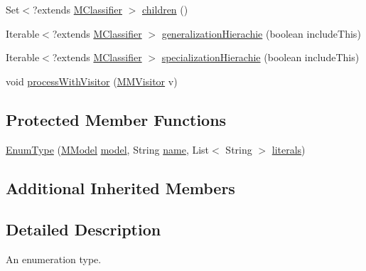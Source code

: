 \begin{DoxyCompactItemize}
\item 
Set$<$?extends \hyperlink{interfaceorg_1_1tzi_1_1use_1_1uml_1_1mm_1_1_m_classifier}{M\-Classifier} $>$ \hyperlink{classorg_1_1tzi_1_1use_1_1uml_1_1ocl_1_1type_1_1_enum_type_acdc9647c394633c3cb21d9c0d3443e03}{children} ()
\item 
Iterable$<$?extends \hyperlink{interfaceorg_1_1tzi_1_1use_1_1uml_1_1mm_1_1_m_classifier}{M\-Classifier} $>$ \hyperlink{classorg_1_1tzi_1_1use_1_1uml_1_1ocl_1_1type_1_1_enum_type_a321293e0e9a1df9d3ef7496a20866540}{generalization\-Hierachie} (boolean include\-This)
\item 
Iterable$<$?extends \hyperlink{interfaceorg_1_1tzi_1_1use_1_1uml_1_1mm_1_1_m_classifier}{M\-Classifier} $>$ \hyperlink{classorg_1_1tzi_1_1use_1_1uml_1_1ocl_1_1type_1_1_enum_type_af4e9eb386830dcc5ed48214b90443bfc}{specialization\-Hierachie} (boolean include\-This)
\item 
void \hyperlink{classorg_1_1tzi_1_1use_1_1uml_1_1ocl_1_1type_1_1_enum_type_a1f84963cd6cca14aff830a3f6d2b2611}{process\-With\-Visitor} (\hyperlink{interfaceorg_1_1tzi_1_1use_1_1uml_1_1mm_1_1_m_m_visitor}{M\-M\-Visitor} v)
\end{DoxyCompactItemize}
\subsection*{Protected Member Functions}
\begin{DoxyCompactItemize}
\item 
\hyperlink{classorg_1_1tzi_1_1use_1_1uml_1_1ocl_1_1type_1_1_enum_type_a896766204ebfba7d32ff65db25982177}{Enum\-Type} (\hyperlink{classorg_1_1tzi_1_1use_1_1uml_1_1mm_1_1_m_model}{M\-Model} \hyperlink{classorg_1_1tzi_1_1use_1_1uml_1_1mm_1_1_m_classifier_impl_a12a5d3d4ce833383eca8ef43a73e2484}{model}, String \hyperlink{classorg_1_1tzi_1_1use_1_1uml_1_1mm_1_1_m_model_element_impl_ac9997b04c10d247c21c22d431d99400d}{name}, List$<$ String $>$ \hyperlink{classorg_1_1tzi_1_1use_1_1uml_1_1ocl_1_1type_1_1_enum_type_aecbe55da61a60059f21641fc7b341079}{literals})
\end{DoxyCompactItemize}
\subsection*{Additional Inherited Members}


\subsection{Detailed Description}
An enumeration type.

